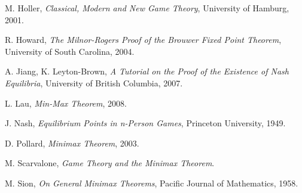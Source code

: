 \documentclass[12pt]{article}
\theoremstyle{definition}
\theoremstyle{remark}
\begin{document}
\begin{thebibliography}{9}

M. Holler, \textit{Classical, Modern and New Game Theory}, University of Hamburg, 2001.

R. Howard, \textit{The Milnor-Rogers Proof of the Brouwer Fixed Point Theorem}, University of South Carolina, 2004.

A. Jiang, K. Leyton-Brown, \textit{A Tutorial on the Proof of the Existence of Nash Equilibria}, University of British Columbia, 2007.

L. Lau, \textit{Min-Max Theorem}, 2008.

J. Nash, \textit{Equilibrium Points in n-Person Games}, Princeton University, 1949.

D. Pollard, \textit{Minimax Theorem}, 2003.

M. Scarvalone, \textit{Game Theory and the Minimax Theorem}.

M. Sion, \textit{On General Minimax Theorems}, Pacific Journal of Mathematics, 1958.

\end{thebibliography}
\end{document}
